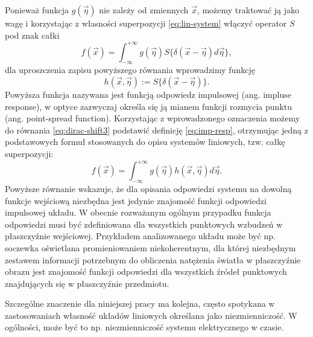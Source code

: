 Ponieważ funkcja $g(\vec{\eta})$ nie zależy od zmiennych $\vec{x}$, możemy traktować ją jako wagę i korzystając z własności superpozycji \ref{eq:lin-system} włączyć operator $S{}$ pod znak całki
\begin{equation}
f(\vec{x})=\int_{-\infty}^{+\infty} g(\vec{\eta})  S\{\delta(\vec{x}-\vec{\eta}) d \vec{\eta} \},
\label{eq:dirac-shift3}
\end{equation}
dla uproszczenia zapisu powyższego równania wprowadzimy funkcję
\begin{equation}
h(\vec{x},\vec{\eta}):=S\{\delta(\vec{x}-\vec{\eta})\}.
\label{eq:imp-resp}
\end{equation}
Powyższa funkcja nazywana jest funkcją odpowiedz impulsowej (ang. impluse response), w optyce zazwyczaj określa się ją mianem funkcji rozmycia punktu (ang. point-spread function). Korzystając z wprowadzonego oznaczenia możemy do równania \ref{eq:dirac-shift3}  podstawić definicję \ref{eq:imp-resp}, otrzymując jedną z podstawowych formuł stosowanych do opisu systemów liniowych, tzw. całkę superpozycji:
\begin{equation}
f(\vec{x})=\int_{-\infty}^{+\infty} g(\vec{\eta})  h(\vec{x},\vec{\eta}) d \vec{\eta} .
\label{eq:sup-int}
\end{equation}
Powyższe równanie wskazuje, że dla opisania odpowiedzi systemu na dowolną funkcje wejściową niezbędna jest jedynie znajomość funkcji odpowiedzi impulsowej układu. W obecnie rozważanym ogólnym przypadku funkcja odpowiedzi musi być zdefiniowana dla wszystkich punktowych wzbudzeń w płaszczyźnie wejściowej. Przykładem analizowanego układu może być np. soczewka oświetlana promieniowaniem niekoherentnym, dla której niezbędnym zestawem informacji potrzebnym do obliczenia natężenia światła w płaszczyźnie obrazu jest znajomość funkcji odpowiedzi dla wszystkich źródeł punktowych znajdujących się w płaszczyźnie przedmiotu. 

Szczególne znaczenie dla niniejszej pracy ma kolejna, często spotykana w zastosowaniach własność układów liniowych określana jako niezmienniczość. W ogólności, może być to np. niezmienniczość systemu elektrycznego w czasie. 

